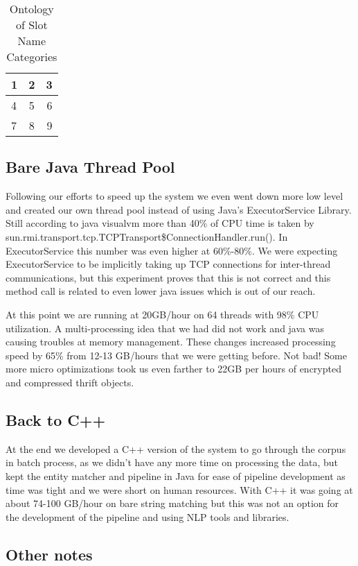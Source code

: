 \begin{table}
\caption{Ontology of Slot Name Categories }
\centering
\begin{tabular}[c]{ |l| c |r| } \hline
  1 & 2 & 3 \\\hline
  4 & 5 & 6 \\\hline
  7 & 8 & 9 \\\hline
\end{tabular}
\end{table}

\subsection{Bare Java Thread Pool}

Following our efforts to speed up the system we even went down more low level and created our own thread pool instead of using Java's ExecutorService Library. Still according to java visualvm more than 40\% of CPU time is  taken by sun.rmi.transport.tcp.TCPTransport\$ConnectionHandler.run(). In ExecutorService this number was even higher at 60\%-80\%. We were expecting ExecutorService to be implicitly taking up TCP connections for inter-thread communications, but this experiment proves that this is not correct and this method call is related to even lower java issues which is out of our reach.

At this point we are running at 20GB/hour on 64 threads with 98\% CPU utilization. A multi-processing idea that we had did not work and java was causing troubles at memory management. These changes increased processing speed by 65\% from 12-13 GB/hours that we were getting before. Not bad! Some more micro optimizations took us even farther to 22GB per hours of encrypted and compressed thrift objects.

\subsection{Back to C++}

At the end we developed a C++ version of the system to go through the corpus in batch process, as we didn’t have any more time on processing the data, but kept the entity matcher and pipeline in Java for ease of pipeline development as time was tight and we were short on human resources. With C++ it was going at about 74-100 GB/hour on bare string matching but this was not an option for the development of the pipeline and using NLP tools and libraries.

\subsection{Other notes}

